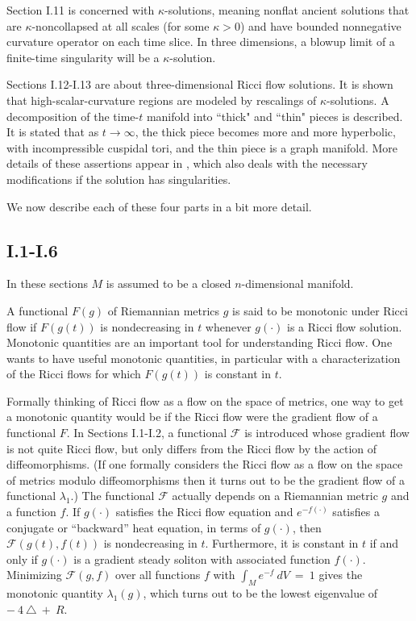 \documentclass[12pt]{amsart}
\numberwithin{equation}{section}
\theoremstyle{plain}
\theoremstyle{definition}
\theoremstyle{remark}
\begin{document}
Section I.11 is concerned with $\kappa$-solutions, meaning nonflat
ancient solutions that are $\kappa$-noncollapsed at all scales
(for some $\kappa > 0$) and have bounded nonnegative curvature
operator on each time slice. In three dimensions, a blowup limit of a
finite-time singularity will be a $\kappa$-solution. 

Sections I.12-I.13 are about three-dimensional Ricci flow solutions.
It is shown that high-scalar-curvature regions are modeled by
rescalings of $\kappa$-solutions. A decomposition of the
time-$t$ manifold into ``thick" and ``thin" pieces is described. 
It is stated that as $t \rightarrow \infty$, the thick piece becomes
more and more hyperbolic, with incompressible cuspidal tori, and the thin
piece is a graph manifold. More details of these assertions
appear in \cite{Perelman2}, which also
deals with the necessary modifications if the solution has singularities.

We now describe each of these four parts in a bit more detail.

\subsection{I.1-I.6}

In these sections $M$ is assumed to be a closed $n$-dimensional
manifold.

A functional $F(g)$ of Riemannian metrics $g$ is said to be monotonic
under Ricci flow if $F(g(t))$ is nondecreasing in $t$ whenever $g(\cdot)$ is
a Ricci flow solution.
Monotonic quantities are an important tool for understanding Ricci flow. One wants
to have useful monotonic quantities, in particular with a characterization
of the Ricci flows for which $F(g(t))$ is constant in $t$.

Formally thinking of Ricci flow as a flow on the space of 
metrics, one way to get a monotonic quantity  would be if the Ricci flow
were the gradient flow of a functional $F$. In Sections I.1-I.2, a functional ${\mathcal F}$
is introduced whose gradient flow is not quite Ricci flow, but only
differs from the Ricci flow by the action of diffeomorphisms.  
(If one formally considers the Ricci flow as a flow on the space of
metrics modulo diffeomorphisms then it turns out to be the gradient flow of a functional
$\lambda_1$.) The functional ${\mathcal F}$ actually depends on a Riemannian metric
$g$ and a function $f$. If $g(\cdot)$ satisfies the Ricci flow equation
and $e^{-f(\cdot)}$ satisfies a conjugate or ``backward'' 
heat equation, in terms of $g(\cdot)$, then
${\mathcal F}(g(t),f(t))$ is nondecreasing in $t$. Furthermore, it is
constant in $t$ if and only if $g(\cdot)$ is a gradient steady soliton with
associated function $f(\cdot)$. Minimizing ${\mathcal F}(g,f)$ over all
functions $f$ with $\int_M e^{-f} \: dV \: = \: 1$ gives the monotonic
quantity $\lambda_1(g)$, which turns out to be the
lowest eigenvalue of $- \: 4 \: \triangle \: + \: R$. 
\end{document}
